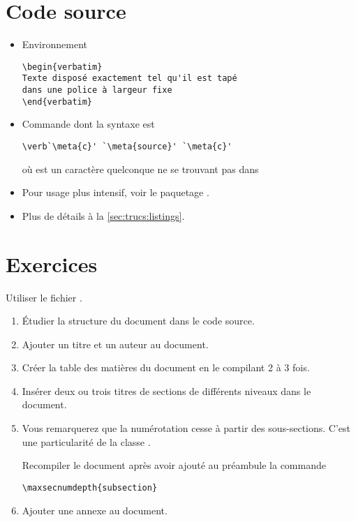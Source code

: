 \section{Code source}

\begin{itemize}
\item Environnement 
\begin{lstlisting}
\begin{verbatim}
Texte disposé exactement tel qu'il est tapé
dans une police à largeur fixe
\end{verbatim}
\end{lstlisting}
\item Commande \cmd{\verb} dont la syntaxe est
\begin{lstlisting}
\verb`\meta{c}' `\meta{source}' `\meta{c}'
\end{lstlisting}
  où  est un caractère quelconque ne se trouvant pas dans
\item Pour usage plus intensif, voir le paquetage .
\item Plus de détails à la \autoref{sec:trucs:listings}.
\end{itemize}





\section{Exercices}
\label{sec:apparence:exercices}

\begin{exercice}[nosol]
  Utiliser le fichier .
  \begin{enumerate}
  \item Étudier la structure du document dans le code source.
  \item Ajouter un titre et un auteur au document.
  \item Créer la table des matières du document en le compilant 2 à 3
    fois.
  \item Insérer deux ou trois titres de sections de différents niveaux
    dans le document.
  \item Vous remarquerez que la numérotation cesse à partir des
    sous-sections. C'est une particularité de la classe
    .

    Recompiler le document après avoir ajouté au préambule la commande
\begin{lstlisting}
\maxsecnumdepth{subsection}
\end{lstlisting}
  \item Ajouter une annexe au document.
  \end{enumerate}
\end{exercice}

